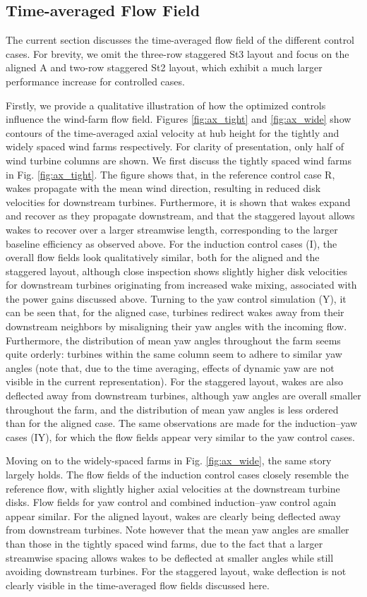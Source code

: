 \documentclass[a4paper]{jpconf}
\begin{document}
\subsection{Time-averaged Flow Field}
The current section discusses the time-averaged flow field of the different control cases. For brevity, we omit the three-row staggered St3 layout and focus on the aligned A and two-row staggered St2 layout, which exhibit a much larger performance increase for controlled cases. 

Firstly, we provide a qualitative illustration of how the optimized controls influence the wind-farm flow field. Figures \ref{fig:ax_tight} and
\ref{fig:ax_wide} show contours of the time-averaged axial velocity at hub height for the tightly and widely spaced wind farms respectively. For
clarity of presentation, only half of wind turbine columns are shown. We first discuss the tightly spaced wind farms in Fig.
\ref{fig:ax_tight}. The figure shows that, in the reference control case R, wakes propagate with the mean wind direction, resulting in reduced disk velocities for downstream turbines. Furthermore, it is shown that wakes expand and
recover as they propagate downstream, and that the staggered layout allows wakes to recover over a larger streamwise length, corresponding to the
larger baseline efficiency as observed above. For the induction control cases (I), the overall flow fields look qualitatively similar, both for the
aligned and the staggered layout, although close inspection shows slightly higher disk velocities for downstream turbines originating from increased wake mixing, associated with the power
gains discussed above. Turning to the yaw control simulation (Y), it can be seen that, for the aligned case, turbines redirect wakes away from their
downstream neighbors by misaligning their yaw angles with the incoming flow. Furthermore, the distribution of mean yaw angles throughout the farm
seems quite orderly: turbines within the same column seem to adhere to similar yaw angles (note that, due to the time averaging, effects of dynamic
yaw are not visible in the current representation). For the staggered layout, wakes are also deflected away from downstream turbines, although yaw
angles are overall smaller throughout the farm, and the distribution of mean yaw angles is less ordered than for the aligned case. The same
observations are made for the induction--yaw cases (IY), for which the flow fields appear very similar to the yaw control cases.


Moving on to the widely-spaced farms in Fig. \ref{fig:ax_wide}, the same story largely holds. The flow fields of the induction control cases closely resemble the reference flow, with slightly higher axial velocities at the downstream turbine disks. Flow fields for yaw control and combined induction--yaw control again appear similar.  For the aligned layout, wakes are clearly being deflected away from downstream turbines. Note however that the mean yaw angles are smaller than those in the tightly spaced wind farms, due to the fact that a larger streamwise spacing allows wakes to be deflected at smaller angles while still avoiding downstream turbines. For the staggered layout, wake deflection is not clearly visible in the time-averaged flow fields discussed here. 
\end{document}
